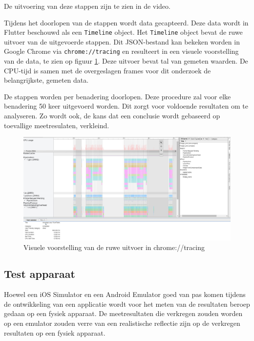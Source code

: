 De uitvoering van deze stappen zijn te zien in de video. \autocite{DeVrient2019f}

Tijdens het doorlopen van de stappen wordt data gecapteerd. Deze data wordt in Flutter beschouwd als een \verb|Timeline| object. Het \verb|Timeline| object bevat de ruwe uitvoer van de uitgevoerde stappen. Dit JSON-bestand kan bekeken worden in Google Chrome via \verb|chrome://tracing| en resulteert in een visuele voorstelling van de data, te zien op figuur \ref{fig:chrome-tracing-timeline}. Deze uitvoer bevat tal van gemeten waarden. De CPU-tijd is samen met de overgeslagen frames voor dit onderzoek de belangrijkste, gemeten data. 

De stappen worden per benadering doorlopen. Deze procedure zal voor elke benadering 50 keer uitgevoerd worden. Dit zorgt voor voldoende resultaten om te analyseren. Zo wordt ook, de kans dat een conclusie wordt gebaseerd op toevallige meetresulaten, verkleind.

\begin{figure}[H]
    \includegraphics[width=\linewidth]{img/methodologie/chrome-tracing-timeline.jpg}
    \caption{Visuele voorstelling van de ruwe uitvoer in chrome://tracing}
    \label{fig:chrome-tracing-timeline}
\end{figure}


\subsection{Test apparaat}
Hoewel een iOS Simulator en een Android Emulator goed van pas komen tijdens de ontwikkeling van een applicatie wordt voor het meten van de resultaten beroep gedaan op een fysiek apparaat. De meetresultaten die verkregen zouden worden op een emulator zouden verre van een realistische reflectie zijn op de verkregen resultaten op een fysiek apparaat. \autocite{Flutter2019c}


